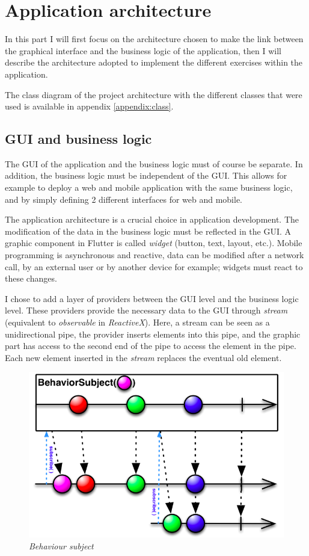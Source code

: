 \section{Application architecture}

In this part I will first focus on the architecture chosen to make the link between the graphical interface and the business logic of the application, then I will describe the architecture adopted to implement the different exercises within the application.

The class diagram of the project architecture with the different classes that were used is available in appendix \ref{appendix:class}.

\subsection{GUI and business logic}
The GUI of the application and the business logic must of course be separate. In addition, the business logic must be independent of the GUI. This allows for example to deploy a web and mobile application with the same business logic, and by simply defining 2 different interfaces for web and mobile.

The application architecture is a crucial choice in application development. The modification of the data in the business logic must be reflected in the GUI. A graphic component in Flutter is called \textit{widget} (button, text, layout, etc.). Mobile programming is asynchronous and reactive, data can be modified after a network call, by an external user or by another device for example; widgets must react to these changes.

I chose to add a layer of providers between the GUI level and the business logic level. These providers provide the necessary data to the GUI through \textit{stream} (equivalent to \textit{observable} in \textit{ReactiveX}). Here, a stream can be seen as a unidirectional pipe, the provider inserts elements into this pipe, and the graphic part has access to the second end of the pipe to access the element in the pipe. Each new element inserted in the \textit{stream} replaces the eventual old element.

\begin{figure}[H]
  \includegraphics[width=.7\linewidth]{content/imgs/stream.png}
  \caption{\textit{Behaviour subject}}
  \label{fig:stream}
\end{figure}

